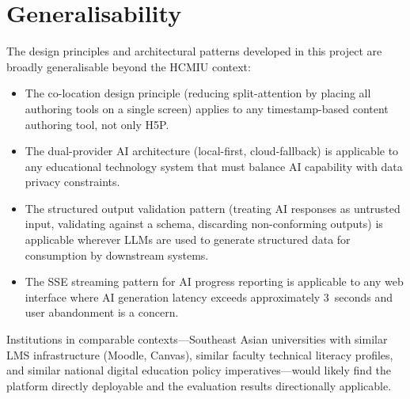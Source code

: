 \section{Generalisability}

The design principles and architectural patterns developed in this project
are broadly generalisable beyond the HCMIU context:

\begin{itemize}
  \item The co-location design principle (reducing split-attention by
  placing all authoring tools on a single screen) applies to any
  timestamp-based content authoring tool, not only H5P.

  \item The dual-provider AI architecture (local-first, cloud-fallback)
  is applicable to any educational technology system that must balance
  AI capability with data privacy constraints.

  \item The structured output validation pattern (treating AI responses
  as untrusted input, validating against a schema, discarding non-conforming
  outputs) is applicable wherever LLMs are used to generate structured data
  for consumption by downstream systems.

  \item The SSE streaming pattern for AI progress reporting is applicable
  to any web interface where AI generation latency exceeds approximately
  3~seconds and user abandonment is a concern.
\end{itemize}

Institutions in comparable contexts---Southeast Asian universities with
similar LMS infrastructure (Moodle, Canvas), similar faculty technical
literacy profiles, and similar national digital education policy
imperatives---would likely find the platform directly deployable and the
evaluation results directionally applicable.
